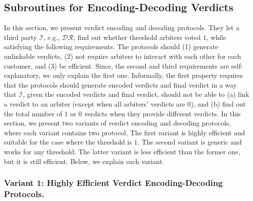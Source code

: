 
\subsection{Subroutines for  Encoding-Decoding Verdicts}


In this section, we present verdict encoding and decoding protocols. They let a third party $\mathcal{I}$, e.g., $\mathcal{DR}$, find out whether threshold  arbiters voted $1$, while satisfying the following  requirements.  The protocols should (1) generate unlinkable verdicts, (2)  not require arbiters to interact with each other for each customer, and (3) be  efficient. Since, the second and third requirements are self-explanatory,  we only explain the first one.  Informally, the first property requires  that the protocols should generate encoded verdicts and final verdict in a way that $\mathcal{I}$,  given the encoded verdicts and final verdict, should not be able to (a)   link a  verdict to an arbiter (except when all arbiters' verdicts are $0$), and (b) find out the total number of $1$ or $0$ verdicts when they provide different verdicts.  In this section, we present two variants of verdict encoding and decoding protocols, where each variant contains two protocol. The first variant is highly efficient and suitable for the case where the threshold is $1$. The second variant is  generic and works for any threshold. The latter variant is less efficient than the former one, but it is still efficient. Below, we explain each variant. 


\subsubsection{Variant 1: Highly Efficient Verdict  Encoding-Decoding Protocols.}

